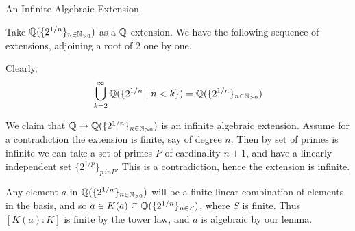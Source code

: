 \documentclass[../book.tex]{subfiles}
\begin{document}
\begin{ex} An Infinite Algebraic Extension.

    Take $\mathbb{Q}(\{2^{1/n}\}_{n \in \mathbb{N}_{>0}})$ as a $\mathbb{Q}$-extension. 
    We have the following sequence of extensions, 
    adjoining a root of $2$ one by one. 
    \begin{figure}[H]
        \centering
    \end{figure}
    Clearly, \[
        \bigcup_{k = 2}^\infty \mathbb{Q}(\{2^{1/n} \mid n < k\}) = 
        \mathbb{Q}(\{2^{1/n}\}_{n \in \mathbb{N}_{>0}})
    \]
    
    We claim that $\mathbb{Q} \to \mathbb{Q}(\{2^{1/n}\}_{n \in \mathbb{N}_{>0}})$ 
    is an infinite algebraic extension. 
    Assume for a contradiction the extension is finite, 
    say of degree $n$. 
    Then by set of primes is infinite we can take a set of primes 
    $P$ of cardinality $n+1$, 
    and have a linearly independent set $\{2^{1/p}\}_{p\ in P}$.
    This is a contradiction, hence the extension is infinite.
    
    Any element $a$ in $\mathbb{Q}(\{2^{1/n}\}_{n \in \mathbb{N}_{>0}})$ 
    will be a finite linear combination of elements in the basis, 
    and so $a \in K(a) \subseteq \mathbb{Q}(\{2^{1/n}\}_{n \in S})$, where $S$ is finite. 
    Thus $[K(a):K]$ is finite by the tower law, and $a$ is algebraic by our lemma.
    
\end{ex}


\end{document}
